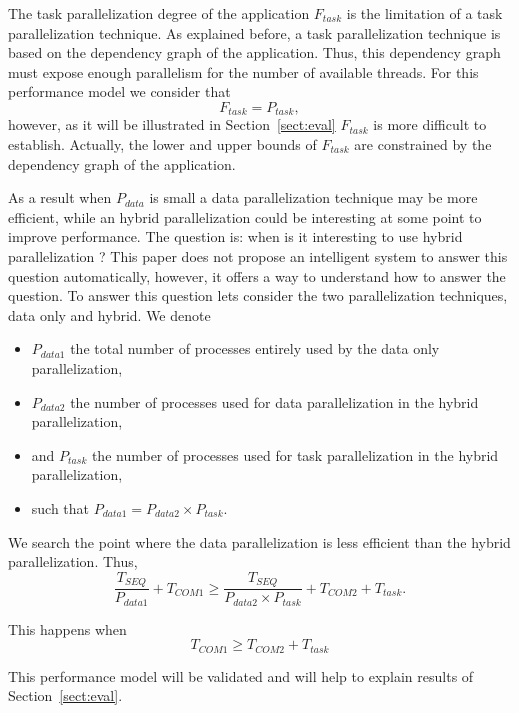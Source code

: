 The task parallelization degree of the application $F_{task}$ is the limitation of a task parallelization technique. As explained before, a task parallelization technique is based on the dependency graph of the application. Thus, this dependency graph must expose enough parallelism for the number of available threads. For this performance model we consider that 
\begin{equation*}
F_{task} = P_{task}, 
\end{equation*}
however, as it will be illustrated in Section~\ref{sect:eval} $F_{task}$ is more difficult to establish. Actually, the lower and upper bounds of $F_{task}$ are constrained by the dependency graph of the application.

\medskip
As a result when $P_{data}$ is small a data parallelization technique may be more efficient, while an hybrid parallelization could be interesting at some point to improve performance. The question is: when is it interesting to use hybrid parallelization ? This paper does not propose an intelligent system to answer this question automatically, however, it offers a way to understand how to answer the question. To answer this question lets consider the two parallelization techniques, data only and hybrid. We denote
\begin{itemize}
\item $P_{data1}$ the total number of processes entirely used by the data only parallelization,
\item $P_{data2}$ the number of processes used for data parallelization in the hybrid parallelization,
\item and $P_{task}$ the number of processes used for task parallelization in the hybrid parallelization,
\item such that $P_{data1} = P_{data2} \times P_{task}$.
\end{itemize}

We search the point where the data parallelization is less efficient than the hybrid parallelization. Thus, 
\begin{equation*}
\frac{T_{SEQ}}{P_{data1}} + T_{COM1} \geq \frac{T_{SEQ}}{P_{data2} \times P_{task}} + T_{COM2} + T_{task}.
\end{equation*}

This happens when
\begin{equation}
T_{COM1} \geq T_{COM2} + T_{task}
\label{eq:hyb}
\end{equation}

This performance model will be validated and will help to explain results of Section~\ref{sect:eval}.